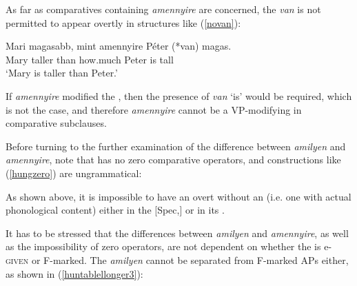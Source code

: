 As far as comparatives containing \textit{amennyire} are concerned, the  \textit{van} is not permitted to appear overtly in structures like (\ref{novan}):

\ea \gll	Mari magasabb, mint	amennyire	Péter	(*van) magas. \label{novan}\\
Mary taller	than how.much	Peter \phantom{*(}is tall\\
\glt `Mary is taller than Peter.'
\z
	
If \textit{amennyire} modified the , then the presence of \textit{van} `is' would be required, which is not the case, and therefore \textit{amennyire} cannot be a VP-modifying  in comparative subclauses.

Before turning to the further examination of the difference between \textit{amilyen} and \textit{amennyire}, note that  has no zero comparative operators, and constructions like (\ref{hungzero}) are ungrammatical:

\ea \label{hungzero}
\z
\z

As shown above, it is impossible to have an overt  without an  (i.e. one with actual phonological content) either in the [Spec,] or in its .

It has to be stressed that the differences between \textit{amilyen} and \textit{amennyire}, as well as the impossibility of zero operators, are not dependent on whether the  is e-\textsc{given} or F-marked.  The  \textit{amilyen} cannot be separated from F-marked APs either, as shown in (\ref{huntablellonger3}):

\ea \label{huntablellonger3}
\z
\z

